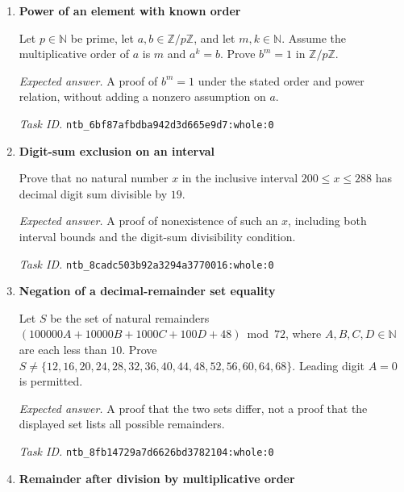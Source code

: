 \documentclass[11pt]{article}
\newcommand{\pth}[1]{\nolinkurl{#1}}
\begin{document}
\begin{enumerate}[label={DEV \arabic*.},leftmargin=4.5em,itemsep=1em]
For every odd integer $k$, prove that there are no integers $x,y$ with $x^4-y^4=1223334444k$.

\emph{Expected answer.} A universally quantified nonexistence proof for integer solutions $x,y$ whenever $k$ is odd.

\emph{Task ID.} \pth{ntb_6795aa26f8089aa7c1f49e08:whole:0}

\item \textbf{Power of an element with known order}\label{qn:dev:20}

Let $p\in\mathbb N$ be prime, let $a,b\in\mathbb Z/p\mathbb Z$, and let $m,k\in\mathbb N$. Assume the multiplicative order of $a$ is $m$ and $a^k=b$. Prove $b^m=1$ in $\mathbb Z/p\mathbb Z$.

\emph{Expected answer.} A proof of $b^m=1$ under the stated order and power relation, without adding a nonzero assumption on $a$.

\emph{Task ID.} \pth{ntb_6bf87afbdba942d3d665e9d7:whole:0}

\item \textbf{Digit-sum exclusion on an interval}\label{qn:dev:21}

Prove that no natural number $x$ in the inclusive interval $200\le x\le288$ has decimal digit sum divisible by $19$.

\emph{Expected answer.} A proof of nonexistence of such an $x$, including both interval bounds and the digit-sum divisibility condition.

\emph{Task ID.} \pth{ntb_8cadc503b92a3294a3770016:whole:0}

\item \textbf{Negation of a decimal-remainder set equality}\label{qn:dev:22}

Let $S$ be the set of natural remainders $(100000A+10000B+1000C+100D+48)\bmod72$, where $A,B,C,D\in\mathbb N$ are each less than $10$. Prove $S\ne\{12,\allowbreak16,\allowbreak20,\allowbreak24,\allowbreak28,\allowbreak32,\allowbreak36,\allowbreak40,\allowbreak44,\allowbreak48,\allowbreak52,\allowbreak56,\allowbreak60,\allowbreak64,\allowbreak68\}$. Leading digit $A=0$ is permitted.

\emph{Expected answer.} A proof that the two sets differ, not a proof that the displayed set lists all possible remainders.

\emph{Task ID.} \pth{ntb_8fb14729a7d6626bd3782104:whole:0}

\item \textbf{Remainder after division by multiplicative order}\label{qn:dev:23}


\end{enumerate}
\end{document}
